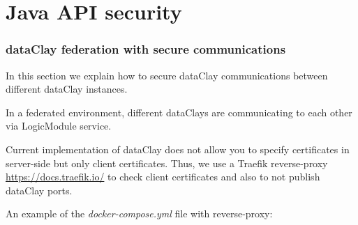 \chapter{Java API security}
\label{sec:JavaAPI security}

\subsection{dataClay federation with secure communications}

In this section we explain how to secure dataClay communications between different dataClay instances.

In a federated environment, different dataClays are communicating to each other via LogicModule service. 

Current implementation of dataClay does not allow you to specify certificates in server-side but only client certificates. 
Thus, we use a Traefik reverse-proxy \href {https://docs.traefik.io/} {https://docs.traefik.io/} 
to check client certificates and also to not publish dataClay ports. 

An example of the \textit{docker-compose.yml} file with reverse-proxy:


